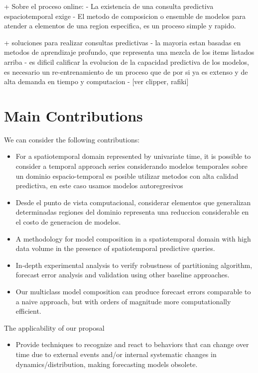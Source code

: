 + Sobre el proceso online:
	- La existencia de una consulta predictiva espaciotemporal exige 
	- El metodo de composicion o ensemble de modelos para atender a elementos de una region especifica, es un proceso simple y rapido. 


+ soluciones para realizar consultas predictivas
	- la mayoria estan basadas en metodos de aprendizaje profundo, que representa una mezcla de los items listados arriba
	- es dificil calificar la evolucion de la capacidad predictiva de los modelos, es necesario un re-entrenamiento de un proceso que de por si ya es extenso y de alta demanda en tiempo y computacion
	- [ver clipper, rafiki]

\section{Main Contributions}
\label{Sec:MainContributions}

We can consider the following contributions:
\begin{itemize}
    \item For a spatiotemporal domain represented by univariate time, it is possible to consider a temporal approach  series considerando modelos temporales sobre un dominio espacio-temporal es posible utilizar metodos con alta calidad predictiva, en este caso usamos modelos autoregresivos
    \item Desde el punto de vista computacional, considerar elementos que generalizan determinadas regiones del dominio representa una reduccion considerable en el costo de generacion de modelos. 
    \item A methodology for model composition in a spatiotemporal domain with high data volume in the presence of spatiotemporal predictive queries.
    \item In-depth experimental analysis to verify robustness of partitioning algorithm, forecast error analysis and validation using other baseline approaches.
    \item Our multiclass model composition can produce forecast errors comparable to a naive approach, but with orders of magnitude more computationally efficient. 
\end{itemize}

The applicability of our proposal

\begin{itemize}
    \item Provide techniques to recognize and react to behaviors that can change over time due to external events and/or internal systematic changes in dynamics/distribution, making forecasting models obsolete.
\end{itemize}

